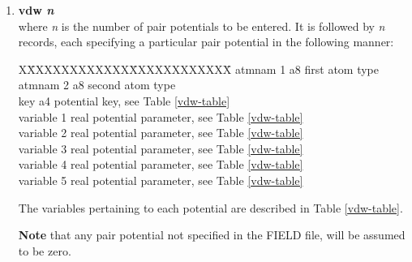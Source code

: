\begin{enumerate}

\item {\bf vdw {\em n}} \\
where {\em n} is the number of pair potentials to be entered.  It
is followed by {\em n} records, each specifying a particular pair
potential in the following manner:
\begin{tabbing}
X\=XXXXXXXXXXXX\=XXXXXXXXXXXX\=\kill
\> atmnam 1     \> a8   \> first atom type \\
\> atmnam 2     \> a8   \> second atom type \\
\> key          \> a4   \> potential key, see Table \ref{vdw-table} \\
\> variable 1   \> real \> potential parameter, see Table \ref{vdw-table} \\
\> variable 2   \> real \> potential parameter, see Table \ref{vdw-table} \\
\> variable 3   \> real \> potential parameter, see Table \ref{vdw-table} \\
\> variable 4   \> real \> potential parameter, see Table \ref{vdw-table} \\
\> variable 5   \> real \> potential parameter, see Table \ref{vdw-table}
\end{tabbing}
The variables pertaining to each potential are described in Table
\ref{vdw-table}.

{\bf Note} that any pair potential not specified in the FIELD
file, will be assumed to be zero.


\end{enumerate}
